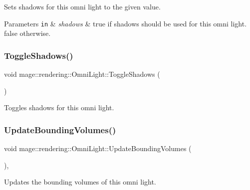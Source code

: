 Sets shadows for this omni light to the given value.


\begin{DoxyParams}[1]{Parameters}
\mbox{\tt in}  & {\em shadows} & {\ttfamily true} if shadows should be used for this omni light. {\ttfamily false} otherwise. \\
\hline
\end{DoxyParams}
\hypertarget{classmage_1_1rendering_1_1_omni_light_aa1816fad8913711c10994b66103279a2}{}\label{classmage_1_1rendering_1_1_omni_light_aa1816fad8913711c10994b66103279a2} 
\subsubsection{\texorpdfstring{Toggle\+Shadows()}{ToggleShadows()}}
{\footnotesize\ttfamily void mage\+::rendering\+::\+Omni\+Light\+::\+Toggle\+Shadows (\begin{DoxyParamCaption}{ }\end{DoxyParamCaption})\hspace{0.3cm}{\ttfamily [noexcept]}}

Toggles shadows for this omni light. \hypertarget{classmage_1_1rendering_1_1_omni_light_a44c6dee7d24c879aab0284ac21910337}{}\label{classmage_1_1rendering_1_1_omni_light_a44c6dee7d24c879aab0284ac21910337} 
\subsubsection{\texorpdfstring{Update\+Bounding\+Volumes()}{UpdateBoundingVolumes()}}
{\footnotesize\ttfamily void mage\+::rendering\+::\+Omni\+Light\+::\+Update\+Bounding\+Volumes (\begin{DoxyParamCaption}{ }\end{DoxyParamCaption})\hspace{0.3cm}{\ttfamily [private]}, {\ttfamily [noexcept]}}

Updates the bounding volumes of this omni light. \hypertarget{classmage_1_1rendering_1_1_omni_light_a7b4bd4cdd980feb3d841fff5947720e9}{}\label{classmage_1_1rendering_1_1_omni_light_a7b4bd4cdd980feb3d841fff5947720e9} 
